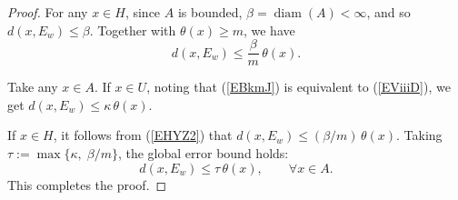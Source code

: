 \documentclass[11pt]{article}
\begin{document}
\begin{proof}
	For any $x\in H$, since $A$ is bounded, $\beta =\operatorname{diam}(A)<\infty$, and so $d(x,E_w)\le \beta$. Together with $\theta(x)\ge m$, we have 
	\begin{equation} \label{EHYZ2}
		d(x,E_w)\le \frac{\beta}{m}\,\theta(x).  
	\end{equation}
	
	Take any $x\in A$.  If $x\in U$, noting that  (\ref{EBkmJ})  is  equivalent to (\ref{EViiiD}), we get  
	   $d(x,E_w)\le\kappa\,\theta(x)$.
  
 If $x\in H$,  it follows from  (\ref{EHYZ2}) that $d(x,E_w)\le (\beta/m)\,\theta(x)$.
 	Taking $\tau:=\max\{\kappa,\; \beta/m\}$, the global error bound holds:
	\[
	d(x,E_w)\le\tau\,\theta(x),\qquad \forall x\in A.
	\]
	This completes the proof. 
	\end{proof}

  
 
\end{document}
